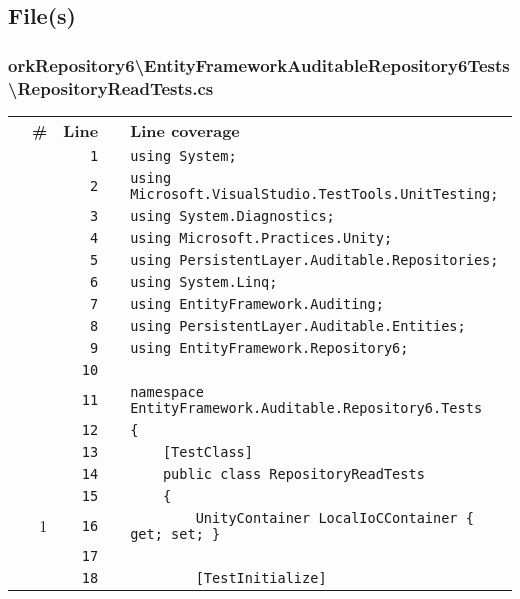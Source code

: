 \documentclass[a4paper,10pt]{article}
\begin{document}
\subsection{File(s)}
\subsubsection{orkRepository6\textbackslash EntityFrameworkAuditableRepository6Tests\textbackslash RepositoryReadTests.cs}
\begin{longtable}[l]{lrrll}
\textbf{} & \textbf{\#} & \textbf{Line} & \textbf{} & \textbf{Line coverage}\\
\cellcolor{gray} &  & \verb~1~ & & \verb~using System;~\\
\cellcolor{gray} &  & \verb~2~ & & \verb~using Microsoft.VisualStudio.TestTools.UnitTesting;~\\
\cellcolor{gray} &  & \verb~3~ & & \verb~using System.Diagnostics;~\\
\cellcolor{gray} &  & \verb~4~ & & \verb~using Microsoft.Practices.Unity;~\\
\cellcolor{gray} &  & \verb~5~ & & \verb~using PersistentLayer.Auditable.Repositories;~\\
\cellcolor{gray} &  & \verb~6~ & & \verb~using System.Linq;~\\
\cellcolor{gray} &  & \verb~7~ & & \verb~using EntityFramework.Auditing;~\\
\cellcolor{gray} &  & \verb~8~ & & \verb~using PersistentLayer.Auditable.Entities;~\\
\cellcolor{gray} &  & \verb~9~ & & \verb~using EntityFramework.Repository6;~\\
\cellcolor{gray} &  & \verb~10~ & & \verb~~\\
\cellcolor{gray} &  & \verb~11~ & & \verb~namespace EntityFramework.Auditable.Repository6.Tests~\\
\cellcolor{gray} &  & \verb~12~ & & \verb~{~\\
\cellcolor{gray} &  & \verb~13~ & & \verb~    [TestClass]~\\
\cellcolor{gray} &  & \verb~14~ & & \verb~    public class RepositoryReadTests~\\
\cellcolor{gray} &  & \verb~15~ & & \verb~    {~\\
\cellcolor{green} & 1 & \verb~16~ & & \verb~        UnityContainer LocalIoCContainer { get; set; }~\\
\cellcolor{gray} &  & \verb~17~ & & \verb~~\\
\cellcolor{gray} &  & \verb~18~ & & \verb~        [TestInitialize]~\\

\end{longtable}
\end{document}
